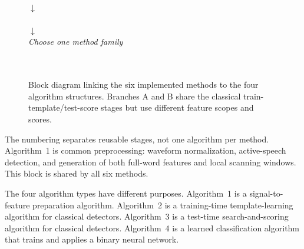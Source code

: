 \documentclass[conference]{IEEEtran}
\begin{document}
\begin{figure}[H]
    \centering
    \small
    \setlength{\fboxsep}{4pt}
    \\[1mm]
    $\downarrow$\\[-1mm]
    \\[1mm]
    $\downarrow$\\[-1mm]
    \emph{Choose one method family}\\[1mm]
    \\[1mm]
    \\[1mm]
    \caption{Block diagram linking the six implemented methods to the four algorithm structures. Branches A and B share the classical train-template/test-score stages but use different feature scopes and scores.}
    \label{fig:methodmap}
\end{figure}

The numbering separates reusable stages, not one algorithm per method. Algorithm~1 is common preprocessing: waveform normalization, active-speech detection, and generation of both full-word features and local scanning windows. This block is shared by all six methods.

The four algorithm types have different purposes. Algorithm~1 is a signal-to-feature preparation algorithm. Algorithm~2 is a training-time template-learning algorithm for classical detectors. Algorithm~3 is a test-time search-and-scoring algorithm for classical detectors. Algorithm~4 is a learned classification algorithm that trains and applies a binary neural network.
\end{document}

